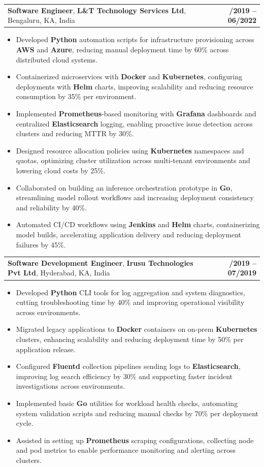 \documentclass[letterpaper,11pt]{article}
\makeatletter
\newcommand{\resumeItem}[1]{
  \item\footnotesize{
    {#1 \vspace{-2pt}}
  }
}
\newcommand{\resumeSubheading}[4]{
  \vspace{-2pt}\item
    \begin{tabular*}{1.0\textwidth}[t]{l@{\extracolsep{\fill}}r}
      \textbf{\fontsize{10pt}{14pt}\selectfont #3}, \textbf{\fontsize{10pt}{14pt}\selectfont #1}, \fontsize{10pt}{14pt}\selectfont #4 & \textbf{\fontsize{10pt}{14pt}\selectfont #2} \\
    \end{tabular*}\vspace{-7pt}
}
\newcommand{\resumeItemListStart}{\begin{itemize}[leftmargin=*]}
\newcommand{\resumeItemListEnd}{\end{itemize}\vspace{-5pt}}
\makeatother
\begin{document}
    \resumeSubheading
        {L\&T Technology Services Ltd}{08/2019 -- 06/2022}
        {Software Engineer}{Bengaluru, KA, India}
      \resumeItemListStart
        \resumeItem{Developed \textbf{Python} automation scripts for infrastructure provisioning across \textbf{AWS} and \textbf{Azure}, reducing manual deployment time by 60\% across distributed cloud systems.}
        \resumeItem{Containerized microservices with \textbf{Docker} and \textbf{Kubernetes}, configuring deployments with \textbf{Helm} charts, improving scalability and reducing resource consumption by 35\% per environment.}
        \resumeItem{Implemented \textbf{Prometheus}-based monitoring with \textbf{Grafana} dashboards and centralized \textbf{Elasticsearch} logging, enabling proactive issue detection across clusters and reducing MTTR by 30\%.}
        \resumeItem{Designed resource allocation policies using \textbf{Kubernetes} namespaces and quotas, optimizing cluster utilization across multi-tenant environments and lowering cloud costs by 25\%.}
        \resumeItem{Collaborated on building an inference orchestration prototype in \textbf{Go}, streamlining model rollout workflows and increasing deployment consistency and reliability by 40\%.}
        \resumeItem{Automated CI/CD workflows using \textbf{Jenkins} and \textbf{Helm} charts, containerizing model builds, accelerating application delivery and reducing deployment failures by 45\%.}
      \resumeItemListEnd

    \resumeSubheading
        {Irusu Technologies Pvt Ltd}{01/2019 -- 07/2019}
        {Software Development Engineer}{Hyderabad, KA, India}
      \resumeItemListStart
        \resumeItem{Developed \textbf{Python} CLI tools for log aggregation and system diagnostics, cutting troubleshooting time by 40\% and improving operational visibility across environments.}
        \resumeItem{Migrated legacy applications to \textbf{Docker} containers on on-prem \textbf{Kubernetes} clusters, enhancing scalability and reducing deployment time by 50\% per application release.}
        \resumeItem{Configured \textbf{Fluentd} collection pipelines sending logs to \textbf{Elasticsearch}, improving log search efficiency by 30\% and supporting faster incident investigations across environments.}
        \resumeItem{Implemented basic \textbf{Go} utilities for workload health checks, automating system validation scripts and reducing manual checks by 70\% per deployment cycle.}
        \resumeItem{Assisted in setting up \textbf{Prometheus} scraping configurations, collecting node and pod metrics to enable performance monitoring and alerting across clusters.}
      \resumeItemListEnd
\end{document}
